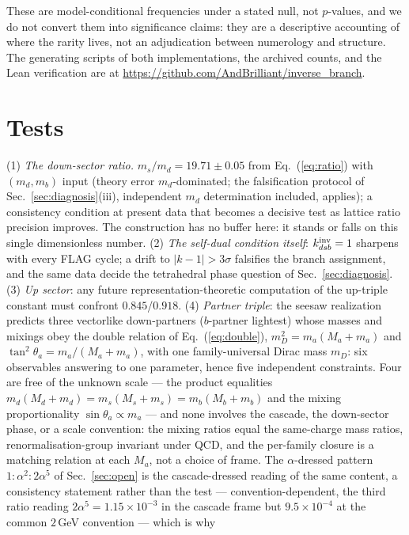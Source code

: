 \documentclass[11pt]{article}
\begin{document}
These are model-conditional frequencies under a stated
null, not $p$-values, and we do not convert them into significance claims:
they are a descriptive accounting of where the rarity lives, not an
adjudication between numerology and structure. The generating scripts of both implementations, the archived counts, and the Lean verification are at \url{https://github.com/AndBrilliant/inverse_branch}.

\section{Tests}
\label{sec:tests}

(1) \emph{The down-sector ratio.} $m_s/m_d = 19.71\pm0.05$ from Eq.~(\ref{eq:ratio}) with $(m_d, m_b)$ input (theory error $m_d$-dominated; the falsification protocol of Sec.~\ref{sec:diagnosis}(iii), independent $m_d$ determination included, applies); a consistency condition at present data that becomes a decisive test as lattice ratio precision improves. The construction has no buffer here: it stands or falls on this single dimensionless number. (2) \emph{The self-dual condition itself}: $k^{\rm inv}_{dsb} = 1$ sharpens with every FLAG cycle; a drift to $|k-1| > 3\sigma$ falsifies the branch assignment, and the same data decide the tetrahedral phase question of Sec.~\ref{sec:diagnosis}. (3) \emph{Up sector}: any future representation-theoretic computation of the up-triple constant must confront $0.845$/$0.918$. (4) \emph{Partner triple}:
the seesaw realization predicts three vectorlike down-partners ($b$-partner
lightest) whose masses and mixings obey the double relation of
Eq.~(\ref{eq:double}), $m_D^2 = m_a(M_a+m_a)$ and
$\tan^2\theta_a = m_a/(M_a+m_a)$, with one family-universal Dirac mass
$m_D$: six observables answering to one parameter, hence five independent
constraints. Four are free of the unknown scale --- the product equalities
$m_d(M_d{+}m_d) = m_s(M_s{+}m_s) = m_b(M_b{+}m_b)$ and the mixing
proportionality $\sin\theta_a \propto m_a$ --- and none involves the
cascade, the down-sector phase, or a scale convention: the mixing ratios
equal the same-charge mass ratios, renormalisation-group invariant under
QCD, and the per-family closure is a matching relation at each $M_a$, not a
choice of frame. The $\alpha$-dressed pattern $1:\alpha^2:2\alpha^5$ of
Sec.~\ref{sec:open} is the cascade-dressed reading of the same content, a
consistency statement rather than the test --- convention-dependent, the
third ratio reading $2\alpha^5 = 1.15\times10^{-3}$ in the cascade frame
but $9.5\times10^{-4}$ at the common $2$\,GeV convention --- which is why
\end{document}
